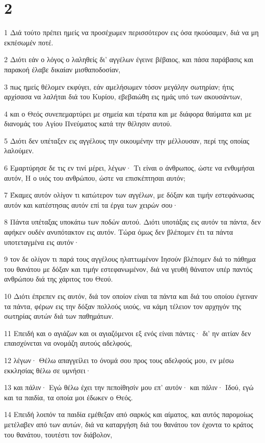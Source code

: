 \chapter{2}

\par 1 Διά τούτο πρέπει ημείς να προσέχωμεν περισσότερον εις όσα ηκούσαμεν, διά να μη εκπέσωμέν ποτέ.
\par 2 Διότι εάν ο λόγος ο λαληθείς δι' αγγέλων έγεινε βέβαιος, και πάσα παράβασις και παρακοή έλαβε δικαίαν μισθαποδοσίαν,
\par 3 πως ημείς θέλομεν εκφύγει, εάν αμελήσωμεν τόσον μεγάλην σωτηρίαν; ήτις αρχίσασα να λαλήται διά του Κυρίου, εβεβαιώθη εις ημάς υπό των ακουσάντων,
\par 4 και ο Θεός συνεπεμαρτύρει με σημεία και τέρατα και με διάφορα θαύματα και με διανομάς του Αγίου Πνεύματος κατά την θέλησιν αυτού.
\par 5 Διότι δεν υπέταξεν εις αγγέλους την οικουμένην την μέλλουσαν, περί της οποίας λαλούμεν.
\par 6 Εμαρτύρησε δε τις εν τινί μέρει, λέγων· Τι είναι ο άνθρωπος, ώστε να ενθυμήσαι αυτόν, Η ο υιός του ανθρώπου, ώστε να επισκέπτησαι αυτόν;
\par 7 Έκαμες αυτόν ολίγον τι κατώτερον των αγγέλων, με δόξαν και τιμήν εστεφάνωσας αυτόν και κατέστησας αυτόν επί τα έργα των χειρών σου·
\par 8 Πάντα υπέταξας υποκάτω των ποδών αυτού. Διότι υποτάξας εις αυτόν τα πάντα, δεν αφήκεν ουδέν ανυπότακτον εις αυτόν. Τώρα όμως δεν βλέπομεν έτι τα πάντα υποτεταγμένα εις αυτόν·
\par 9 τον δε ολίγον τι παρά τους αγγέλους ηλαττωμένον Ιησούν βλέπομεν διά το πάθημα του θανάτου με δόξαν και τιμήν εστεφανωμένον, διά να γευθή θάνατον υπέρ παντός ανθρώπου διά της χάριτος του Θεού.
\par 10 Διότι έπρεπεν εις αυτόν, διά τον οποίον είναι τα πάντα και διά του οποίου έγειναν τα πάντα, φέρων εις την δόξαν πολλούς υιούς, να κάμη τέλειον τον αρχηγόν της σωτηρίας αυτών διά των παθημάτων.
\par 11 Επειδή και ο αγιάζων και οι αγιαζόμενοι εξ ενός είναι πάντες· δι' ην αιτίαν δεν επαισχύνεται να ονομάζη αυτούς αδελφούς,
\par 12 λέγων· Θέλω απαγγείλει το όνομά σου προς τους αδελφούς μου, εν μέσω εκκλησίας θέλω σε υμνήσει·
\par 13 και πάλιν· Εγώ θέλω έχει την πεποίθησίν μου επ' αυτόν· και πάλιν· Ιδού, εγώ και τα παιδία, τα οποία μοι έδωκεν ο Θεός.
\par 14 Επειδή λοιπόν τα παιδία εμέθεξαν από σαρκός και αίματος, και αυτός παρομοίως μετέλαβεν από των αυτών, διά να καταργήση διά του θανάτου τον έχοντα το κράτος του θανάτου, τουτέστι τον διάβολον,

